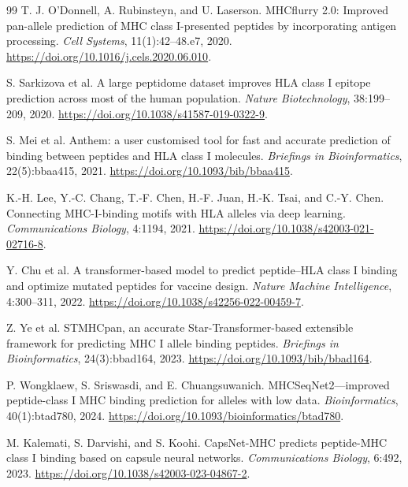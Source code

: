 \begin{thebibliography}{99}
T. J. O'Donnell, A. Rubinsteyn, and U. Laserson.
\newblock MHCflurry 2.0: Improved pan-allele prediction of MHC class I-presented peptides by incorporating antigen processing.
\newblock \emph{Cell Systems}, 11(1):42--48.e7, 2020.
\newblock \url{https://doi.org/10.1016/j.cels.2020.06.010}.

S. Sarkizova et al.
\newblock A large peptidome dataset improves HLA class I epitope prediction across most of the human population.
\newblock \emph{Nature Biotechnology}, 38:199--209, 2020.
\newblock \url{https://doi.org/10.1038/s41587-019-0322-9}.

S. Mei et al.
\newblock Anthem: a user customised tool for fast and accurate prediction of binding between peptides and HLA class I molecules.
\newblock \emph{Briefings in Bioinformatics}, 22(5):bbaa415, 2021.
\newblock \url{https://doi.org/10.1093/bib/bbaa415}.

K.-H. Lee, Y.-C. Chang, T.-F. Chen, H.-F. Juan, H.-K. Tsai, and C.-Y. Chen.
\newblock Connecting MHC-I-binding motifs with HLA alleles via deep learning.
\newblock \emph{Communications Biology}, 4:1194, 2021.
\newblock \url{https://doi.org/10.1038/s42003-021-02716-8}.

Y. Chu et al.
\newblock A transformer-based model to predict peptide--HLA class I binding and optimize mutated peptides for vaccine design.
\newblock \emph{Nature Machine Intelligence}, 4:300--311, 2022.
\newblock \url{https://doi.org/10.1038/s42256-022-00459-7}.

Z. Ye et al.
\newblock STMHCpan, an accurate Star-Transformer-based extensible framework for predicting MHC I allele binding peptides.
\newblock \emph{Briefings in Bioinformatics}, 24(3):bbad164, 2023.
\newblock \url{https://doi.org/10.1093/bib/bbad164}.

P. Wongklaew, S. Sriswasdi, and E. Chuangsuwanich.
\newblock MHCSeqNet2---improved peptide-class I MHC binding prediction for alleles with low data.
\newblock \emph{Bioinformatics}, 40(1):btad780, 2024.
\newblock \url{https://doi.org/10.1093/bioinformatics/btad780}.

M. Kalemati, S. Darvishi, and S. Koohi.
\newblock CapsNet-MHC predicts peptide-MHC class I binding based on capsule neural networks.
\newblock \emph{Communications Biology}, 6:492, 2023.
\newblock \url{https://doi.org/10.1038/s42003-023-04867-2}.


\end{thebibliography}
